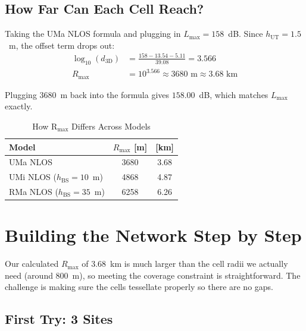 \documentclass[10pt,a4paper,twocolumn]{article}
\begin{document}
\subsection{How Far Can Each Cell Reach?}

Taking the UMa NLOS formula and plugging in $L_{\max} = 158$~dB. Since $h_{\text{UT}} = 1.5$~m, the offset term drops out:
\begin{align}
\log_{10}(d_{3\text{D}}) &= \frac{158 - 13.54 - 5.11}{39.08} = 3.566 \nonumber \\
\boxed{R_{\max}} &= 10^{3.566} \approx \boxed{3680 \text{ m} \approx 3.68 \text{ km}}
\end{align}

Plugging 3680~m back into the formula gives $158.00$~dB, which matches $L_{\max}$ exactly.

\begin{table}[H]
\centering
\caption{How R$_{\text{max}}$ Differs Across Models}
\label{tab:rmax_comparison}
\begin{tabular}{@{}lcc@{}}
\toprule
Model & $R_{\max}$ [m] & [km] \\
\midrule
UMa NLOS & 3680 & 3.68 \\
UMi NLOS ($h_{\text{BS}}{=}10$~m) & 4868 & 4.87 \\
RMa NLOS ($h_{\text{BS}}{=}35$~m) & 6258 & 6.26 \\
\bottomrule
\end{tabular}
\end{table}

\section{Building the Network Step by Step}
\label{sec:network_design}

Our calculated $R_{\max}$ of 3.68~km is much larger than the cell radii we actually need (around 800~m), so meeting the coverage constraint is straightforward. The challenge is making sure the cells tessellate properly so there are no gaps.

\subsection{First Try: 3 Sites}
\end{document}
